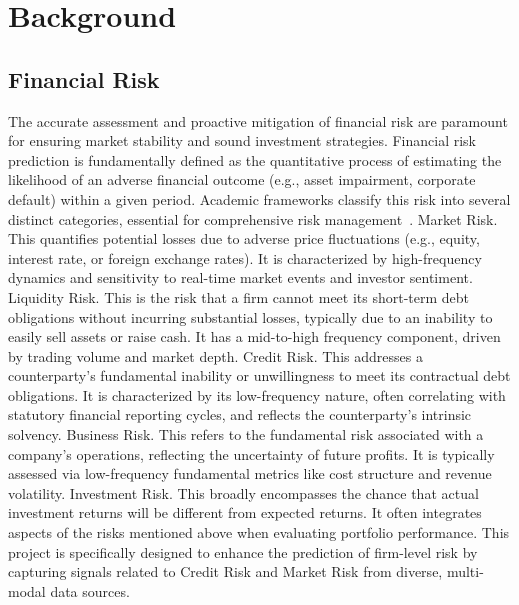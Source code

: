 \section{Background}
\label{sec:background}
\subsection{Financial Risk}
The accurate assessment and proactive mitigation of financial risk are paramount for ensuring market stability and sound investment strategies. Financial risk prediction is fundamentally defined as the quantitative process of estimating the likelihood of an adverse financial outcome (e.g., asset impairment, corporate default) within a given period. Academic frameworks classify this risk into several distinct categories, essential for comprehensive risk management~\cite{risk_classification}.
Market Risk. This quantifies potential losses due to adverse price fluctuations (e.g., equity, interest rate, or foreign exchange rates). It is characterized by high-frequency dynamics and sensitivity to real-time market events and investor sentiment.
Liquidity Risk. This is the risk that a firm cannot meet its short-term debt obligations without incurring substantial losses, typically due to an inability to easily sell assets or raise cash. It has a mid-to-high frequency component, driven by trading volume and market depth.
Credit Risk. This addresses a counterparty's fundamental inability or unwillingness to meet its contractual debt obligations. It is characterized by its low-frequency nature, often correlating with statutory financial reporting cycles, and reflects the counterparty's intrinsic solvency.
Business Risk. This refers to the fundamental risk associated with a company's operations, reflecting the uncertainty of future profits. It is typically assessed via low-frequency fundamental metrics like cost structure and revenue volatility.
Investment Risk. This broadly encompasses the chance that actual investment returns will be different from expected returns. It often integrates aspects of the risks mentioned above when evaluating portfolio performance.
This project is specifically designed to enhance the prediction of firm-level risk by capturing signals related to Credit Risk and Market Risk from diverse, multi-modal data sources.

